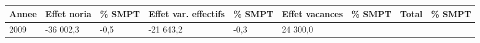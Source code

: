 \begin{longtable}[]{@{}lllllllll@{}}
\toprule
\begin{minipage}[b]{0.05\columnwidth}\raggedright
Annee\strut
\end{minipage} & \begin{minipage}[b]{0.10\columnwidth}\raggedright
Effet noria\strut
\end{minipage} & \begin{minipage}[b]{0.06\columnwidth}\raggedright
\% SMPT\strut
\end{minipage} & \begin{minipage}[b]{0.16\columnwidth}\raggedright
Effet var. effectifs\strut
\end{minipage} & \begin{minipage}[b]{0.06\columnwidth}\raggedright
\% SMPT\strut
\end{minipage} & \begin{minipage}[b]{0.12\columnwidth}\raggedright
Effet vacances\strut
\end{minipage} & \begin{minipage}[b]{0.06\columnwidth}\raggedright
\% SMPT\strut
\end{minipage} & \begin{minipage}[b]{0.09\columnwidth}\raggedright
Total\strut
\end{minipage} & \begin{minipage}[b]{0.06\columnwidth}\raggedright
\% SMPT\strut
\end{minipage}\tabularnewline
\midrule
\endhead
\begin{minipage}[t]{0.05\columnwidth}\raggedright
2009\strut
\end{minipage} & \begin{minipage}[t]{0.10\columnwidth}\raggedright
-36 002,3\strut
\end{minipage} & \begin{minipage}[t]{0.06\columnwidth}\raggedright
-0,5\strut
\end{minipage} & \begin{minipage}[t]{0.16\columnwidth}\raggedright
-21 643,2\strut
\end{minipage} & \begin{minipage}[t]{0.06\columnwidth}\raggedright
-0,3\strut
\end{minipage} & \begin{minipage}[t]{0.12\columnwidth}\raggedright
24 300,0\strut
\end{minipage} & \begin{minipage}[t]{0.06\columnwidth}\raggedright

\end{minipage}
\end{longtable}
